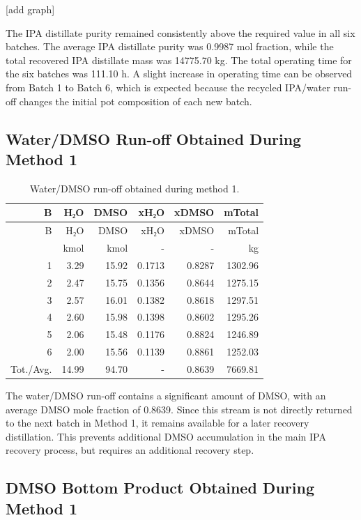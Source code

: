 {[}add graph{]}

The IPA distillate purity remained consistently above the required value
in all six batches. The average IPA distillate purity was 0.9987 mol
fraction, while the total recovered IPA distillate mass was 14775.70 kg.
The total operating time for the six batches was 111.10 h. A slight
increase in operating time can be observed from Batch 1 to Batch 6,
which is expected because the recycled IPA/water run-off changes the
initial pot composition of each new batch.

\subsection{Water/DMSO Run-off Obtained During Method
1}\label{waterdmso-run-off-obtained-during-method-1}

\begin{longtable}[]{@{}rrrrrr@{}}
\caption{Water/DMSO run-off obtained during method 1.
\label{tab:Water/DMSO run-off obtained uring method 1}}\tabularnewline
\toprule\noalign{}
B & H₂O & DMSO & xH₂O & xDMSO & mTotal \\
\midrule\noalign{}
\endfirsthead
\toprule\noalign{}
B & H₂O & DMSO & xH₂O & xDMSO & mTotal \\
\midrule\noalign{}
\endhead
\bottomrule\noalign{}
\endlastfoot
& kmol & kmol & - & - & kg \\
1 & 3.29 & 15.92 & 0.1713 & 0.8287 & 1302.96 \\
2 & 2.47 & 15.75 & 0.1356 & 0.8644 & 1275.15 \\
3 & 2.57 & 16.01 & 0.1382 & 0.8618 & 1297.51 \\
4 & 2.60 & 15.98 & 0.1398 & 0.8602 & 1295.26 \\
5 & 2.06 & 15.48 & 0.1176 & 0.8824 & 1246.89 \\
6 & 2.00 & 15.56 & 0.1139 & 0.8861 & 1252.03 \\
Tot./Avg. & 14.99 & 94.70 & - & 0.8639 & 7669.81 \\
\end{longtable}

The water/DMSO run-off contains a significant amount of DMSO, with an
average DMSO mole fraction of 0.8639. Since this stream is not directly
returned to the next batch in Method 1, it remains available for a later
recovery distillation. This prevents additional DMSO accumulation in the
main IPA recovery process, but requires an additional recovery step.

\subsection{DMSO Bottom Product Obtained During Method
1}\label{dmso-bottom-product-obtained-during-method-1}

